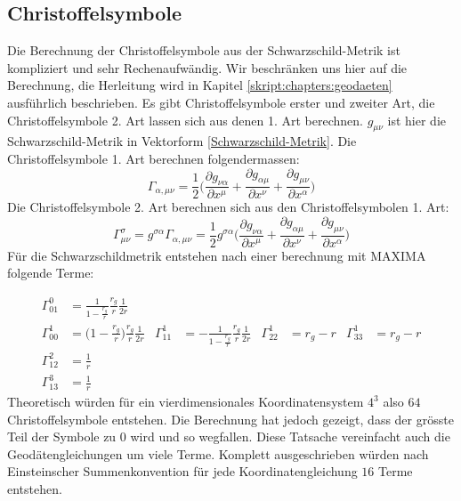 \begin{refsection}
	\subsection{Christoffelsymbole}\label{christoffel}
	
	Die Berechnung der Christoffelsymbole aus der Schwarzschild-Metrik ist kompliziert und sehr Rechenaufwändig. Wir beschränken uns hier auf die Berechnung, die Herleitung wird in Kapitel \ref{skript:chapters:geodaeten} ausführlich beschrieben. Es gibt Christoffelsymbole erster und zweiter Art, die Christoffelsymbole 2. Art lassen sich aus denen 1. Art berechnen.
	$g_{\mu\nu}$ ist hier die Schwarzschild-Metrik in Vektorform \ref{Schwarzschild-Metrik}.
	Die Christoffelsymbole 1. Art berechnen folgendermassen:
	\begin{equation}
		\Gamma_{\alpha,\mu\nu} 
		= 
		\frac{1}{2}\biggl(\frac{\partial g_{\nu\alpha}}{\partial x^{\mu}} 
		+
		\frac{\partial g_{\alpha\mu}}{\partial x^{\nu}}
		+
		\frac{\partial g_{\mu\nu}}{\partial x^{\alpha}}
		 \biggr)
	\end{equation}
	Die Christoffelsymbole 2. Art berechnen sich aus den Christoffelsymbolen 1. Art:
	\begin{equation}
	\Gamma^{\sigma}_{\mu\nu} 
	= 
	g^{\sigma\alpha}\Gamma_{\alpha,\mu\nu} 
	=
	\frac{1}{2}g^{\sigma\alpha}\biggl(\frac{\partial g_{\nu\alpha}}{\partial x^{\mu}} 
	+
	\frac{\partial g_{\alpha\mu}}{\partial x^{\nu}}
	+
	\frac{\partial g_{\mu\nu}}{\partial x^{\alpha}}
	\biggr)
	\end{equation}
	Für die Schwarzschildmetrik entstehen nach einer berechnung mit MAXIMA folgende Terme:
	
	\begin{align*}
	\Gamma^0_{01}
	&=
	\frac{1}{1-\displaystyle\frac{r_g}{r}}
	\frac{r_g}{r}
	\frac{1}{2r}
	\\
	\Gamma^1_{00}
	&=
	\biggl(1-\displaystyle\frac{r_g}{r}\biggr)
	\frac{r_g}{r}
	\frac{1}{2r}
	&
	\Gamma^1_{11}
	&=
	-\frac1{1-\displaystyle\frac{r_g}{r}}
	\frac{r_g}{r}
	\frac{1}{2r}
	&
	\Gamma^1_{22}
	&=
	r_g-r
	&
	\Gamma^1_{33}
	&=
	r_g-r
	\\
	\Gamma^2_{12}
	&=
	\frac1r
	\\
	\Gamma^3_{13}
	&=
	\frac1r
	\end{align*}
	Theoretisch würden für ein vierdimensionales Koordinatensystem $4^{3}$ also $64$ Christoffelsymbole entstehen. Die Berechnung hat jedoch gezeigt, dass der grösste Teil der Symbole zu $0$ wird und so wegfallen. Diese Tatsache vereinfacht auch die Geodätengleichungen um viele Terme. Komplett ausgeschrieben würden nach Einsteinscher Summenkonvention für jede Koordinatengleichung $16$ Terme entstehen.
	

\end{refsection}
